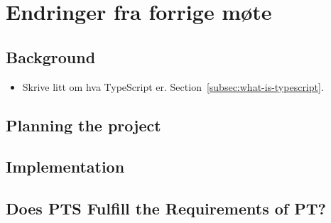 
\chapter*{Endringer fra forrige møte}

\section*{Background}

\begin{itemize}
    \item Skrive litt om hva TypeScript er.
    Section~\vref{subsec:what-is-typescript}.
\end{itemize}

\section*{Planning the project}

\begin{itemize}
\end{itemize}

\section*{Implementation}

\begin{itemize}
\end{itemize}

\section*{Does PTS Fulfill the Requirements of PT?}

\begin{itemize}
\end{itemize}
